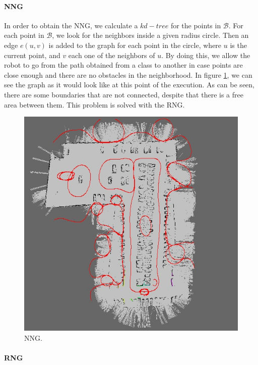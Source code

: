 \paragraph{\acf{NNG}}\label{ch:chapter06_01_01_05_01}

In order to obtain the \ac{NNG}, we calculate a $kd-tree$ for the points in $\mathcal{B}$. For each point in $\mathcal{B}$, we look for the neighbors inside a given radius circle. Then an edge $e(u,v)$ is added to the graph for each point in the circle, where $u$ is the current point, and $v$ each one of the neighbors of $u$. By doing this, we allow the robot to go from the path obtained from a class to another in case points are close enough and there are no obstacles in the neighborhood. In figure \ref{fig:cp06_nng}, we can see the graph as it would look like at this point of the execution. As can be seen, there are some boundaries that are not connected, despite that there is a free area between them. This problem is solved with the \acf{RNG}.

\begin{figure}[h!]
  \centering
  \includegraphics[width=\textwidth, trim=0 0 0 0,clip]{figure3}
  \caption{\acf{NNG}.}
  \label{fig:cp06_nng}
\end{figure}

\paragraph{\acf{RNG}}\label{ch:chapter06_01_01_05_02}

